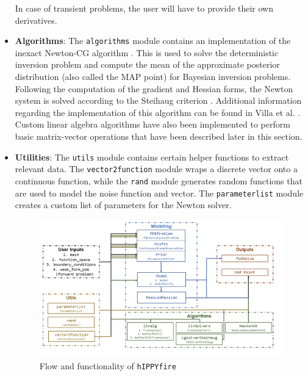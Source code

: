 \begin{itemize}
\begin{enumerate}
    \end{enumerate}  
    In case of transient problems, the user will have to provide their own derivatives.
    \item \textbf{Algorithms}: The \texttt{algorithms} module contains an implementation of the inexact Newton-CG algorithm \cite{borzi2011computational}. This is used to solve the deterministic inversion problem and compute the mean of the approximate posterior distribution (also called the MAP point) for Bayesian inversion problems. Following the computation of the gradient and Hessian forms, the Newton system is solved according to the Steihaug criterion \cite{steihaug1983local}. Additional information regarding the implementation of this algorithm can be found in Villa et al. \cite{Villa2020}.  Custom linear algebra algorithms have also been implemented to perform basic matrix-vector operations that have been described later in this section.
    \item \textbf{Utilities}: The \texttt{utils} module contains certain helper functions to extract relevant data. The \texttt{vector2function} module wraps a discrete vector onto a continuous function, while the \texttt{rand} module generates random functions that are used to model the noise function and vector. The \texttt{parameterlist} module creates a custom list of parameters for the Newton solver.

    \begin{figure}[th]
        \centering
        \includegraphics[width=1.0\textwidth]{figures/hIPPYfire.png}
        \caption{Flow and functionality of \texttt{hIPPYfire}}
        \label{figure:hippyfire}
    \end{figure}
    

\end{itemize}
